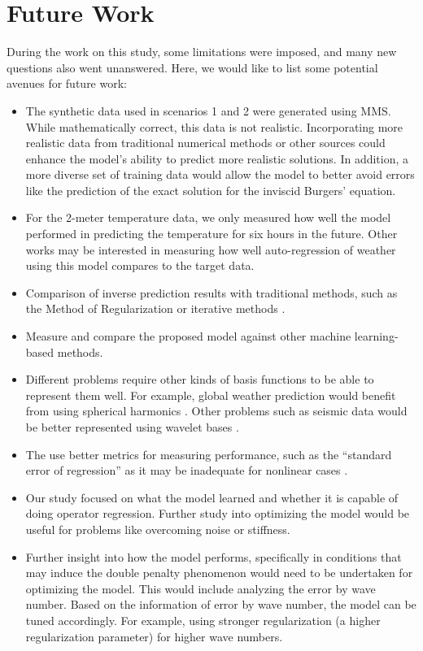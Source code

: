 \section{Future Work}
During the work on this study, some limitations were imposed, and many new questions also went unanswered. Here, we would like to list some potential avenues for future work:
\begin{itemize}
    \item The synthetic data used in scenarios 1 and 2 were generated using MMS\@. While mathematically correct, this data is not realistic. Incorporating more realistic data from traditional numerical methods or other sources could enhance the model's ability to predict more realistic solutions. In addition, a more diverse set of training data would allow the model to better avoid errors like the prediction of the exact solution for the inviscid Burgers' equation.
    \item For the 2-meter temperature data, we only measured how well the model performed in predicting the temperature for six hours in the future. Other works may be interested in measuring how well auto-regression of weather using this model compares to the target data.
    \item Comparison of inverse prediction results with traditional methods, such as the Method of Regularization or iterative methods \autocite{groetschInverseProblemsMathematical1993,vogelComputationalMethodsInverse2002}.
    \item Measure and compare the proposed model against other machine learning-based methods.
    \item Different problems require other kinds of basis functions to be able to represent them well. For example, global weather prediction would benefit from using spherical harmonics \autocite{bonevSphericalFourierNeural2023}. Other problems such as seismic data would be better represented using wavelet bases \autocite{chakrabortyFrequencytimeDecompositionSeismic1995}.
    \item The use better metrics for measuring performance, such as the \enquote{standard error of regression} as it may be inadequate for nonlinear cases \autocite{spiessEvaluationR2Inadequate2010}.
    \item Our study focused on what the model learned and whether it is capable of doing operator regression. Further study into optimizing the model would be useful for problems like overcoming noise or stiffness.
    \item Further insight into how the model performs, specifically in conditions that may induce the double penalty phenomenon would need to be undertaken for optimizing the model. This would include analyzing the error by wave number. Based on the information of error by wave number, the model can be tuned accordingly. For example, using stronger regularization (a higher regularization parameter) for higher wave numbers.

\end{itemize}
